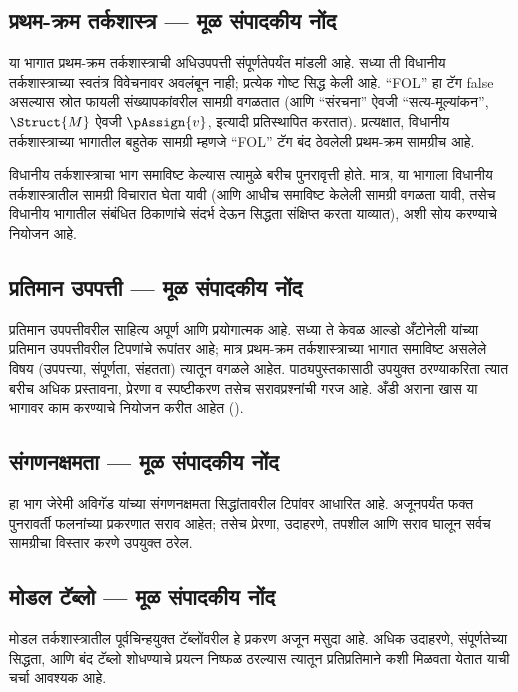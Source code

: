 \subsection{प्रथम-क्रम तर्कशास्त्र — मूळ संपादकीय नोंद}\label{source-driver:OLP-0138}
\begin{editorial}
  या भागात प्रथम-क्रम तर्कशास्त्राची अधिउपपत्ती संपूर्णतेपर्यंत मांडली
  आहे. सध्या ती विधानीय तर्कशास्त्राच्या स्वतंत्र विवेचनावर अवलंबून
  नाही; प्रत्येक गोष्ट सिद्ध केली आहे. ``FOL'' हा टॅग false असल्यास
  स्रोत फायली संख्यापकांवरील सामग्री वगळतात (आणि
  ``संरचना'' ऐवजी ``सत्य-मूल्यांकन'', $\Struct{M}$ ऐवजी
  $\pAssign{v}$, इत्यादी प्रतिस्थापित करतात). प्रत्यक्षात, विधानीय
  तर्कशास्त्राच्या भागातील बहुतेक सामग्री म्हणजे ``FOL'' टॅग बंद
  ठेवलेली प्रथम-क्रम सामग्रीच आहे.

  विधानीय तर्कशास्त्राचा भाग समाविष्ट केल्यास त्यामुळे बरीच
  पुनरावृत्ती होते. मात्र, या भागाला विधानीय तर्कशास्त्रातील सामग्री
  विचारात घेता यावी (आणि आधीच समाविष्ट केलेली सामग्री वगळता यावी,
  तसेच विधानीय भागातील संबंधित ठिकाणांचे संदर्भ देऊन सिद्धता
  संक्षिप्त करता याव्यात), अशी सोय करण्याचे नियोजन आहे.
\end{editorial}
\subsection{प्रतिमान उपपत्ती — मूळ संपादकीय नोंद}\label{source-driver:OLP-0182}
\begin{editorial}
  प्रतिमान उपपत्तीवरील साहित्य अपूर्ण आणि प्रयोगात्मक आहे. सध्या ते केवळ
  आल्डो अँटोनेली यांच्या प्रतिमान उपपत्तीवरील टिपणांचे रूपांतर आहे; मात्र
  प्रथम-क्रम तर्कशास्त्राच्या भागात समाविष्ट असलेले विषय (उपपत्त्या, संपूर्णता,
  संहतता) त्यातून वगळले आहेत. पाठ्यपुस्तकासाठी उपयुक्त ठरण्याकरिता त्यात बरीच
  अधिक प्रस्तावना, प्रेरणा व स्पष्टीकरण तसेच सरावप्रश्नांची गरज आहे. अँडी अराना
  खास या भागावर काम करण्याचे नियोजन करीत आहेत ().
\end{editorial}
\subsection{संगणनक्षमता — मूळ संपादकीय नोंद}\label{source-driver:OLP-0208}
\begin{editorial}
  हा भाग जेरेमी अविगॅड यांच्या संगणनक्षमता सिद्धांतावरील टिपांवर आधारित
  आहे. अजूनपर्यंत फक्त पुनरावर्ती फलनांच्या प्रकरणात सराव आहेत; तसेच
  प्रेरणा, उदाहरणे, तपशील आणि सराव घालून सर्वच सामग्रीचा विस्तार करणे
  उपयुक्त ठरेल.
\end{editorial}
\subsection{मोडल टॅब्लो — मूळ संपादकीय नोंद}\label{source-driver:OLP-0460}
\begin{editorial}
  मोडल तर्कशास्त्रातील पूर्वचिन्हयुक्त टॅब्लोंवरील
  हे प्रकरण अजून मसुदा आहे. अधिक उदाहरणे,
  संपूर्णतेच्या सिद्धता, आणि बंद टॅब्लो शोधण्याचे
  प्रयत्न निष्फळ ठरल्यास त्यातून प्रतिप्रतिमाने
  कशी मिळवता येतात याची चर्चा आवश्यक आहे.
\end{editorial}
